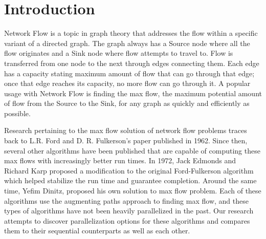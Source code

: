 \section{Introduction}
Network Flow is a topic in graph theory that addresses the flow within a specific variant of a directed graph. The graph always has a Source node where all the flow originates and a Sink node where flow attempts to travel to. Flow is transferred from one node to the next through edges connecting them. Each edge has a capacity stating maximum amount of flow that can go through that edge; once that edge reaches its capacity, no more flow can go through it. A popular usage with Network Flow is finding the max flow, the maximum potential amount of flow from the Source to the Sink, for any graph as quickly and efficiently as possible.

Research pertaining to the max flow solution of network flow problems traces back to L.R. Ford and D. R. Fulkerson's paper published in 1962. Since then, several other algorithms have been published that are capable of computing these max flows with increasingly better run times. In 1972, Jack Edmonds and Richard Karp proposed a modification to the original Ford-Fulkerson algorithm which helped stabilize the run time and guarantee completion. Around the same time, Yefim Dinitz, proposed his own solution to max flow problem. Each of these algorithms use the augmenting paths approach to finding max flow, and these types of algorithms have not been heavily parallelized in the past. Our research attempts to discover parallelization options for these algorithms and compares them to their sequential counterparts as well as each other.